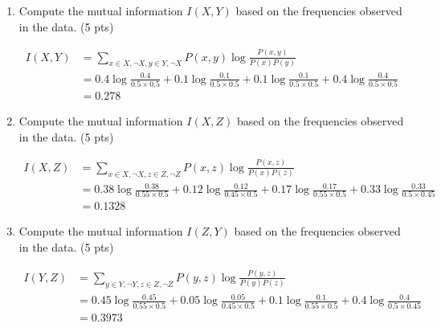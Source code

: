 \documentclass[a4paper]{article}
\theoremstyle{definition}
\newenvironment{soln}{
	\leavevmode\color{blue}\ignorespaces
}{}
\begin{document}
\begin{enumerate}
	\item Compute the mutual information $I(X, Y)$ based on the frequencies observed in the data. (5 pts)
	\begin{soln}
		\begin{align*}
			I(X, Y) &= \sum_{x \in X, \neg X, y \in Y,\neg X} P(x, y) \log \frac{P(x, y)}{P(x) P(y)} \\
			&= 0.4 \log \frac{0.4}{0.5 \times 0.5} + 0.1 \log \frac{0.1}{0.5 \times 0.5} + 0.1 \log \frac{0.1}{0.5 \times 0.5} + 0.4 \log \frac{0.4}{0.5 \times 0.5} \\
			&= 0.278
		\end{align*}
	\end{soln}
	\item Compute the mutual information $I(X, Z)$ based on the frequencies observed in the data. (5 pts)
	\begin{soln}
		\begin{align*}
			I(X, Z) &= \sum_{x \in X, \neg X, z \in Z,\neg Z} P(x, z) \log \frac{P(x, z)}{P(x) P(z)} \\
			&= 0.38 \log \frac{0.38}{0.55 \times 0.5} + 0.12 \log \frac{0.12}{0.45 \times 0.5} + 0.17 \log \frac{0.17}{0.55 \times 0.5} + 0.33 \log \frac{0.33}{0.5 \times 0.45} \\
			&= 0.1328
		\end{align*}
	\end{soln}
	\item Compute the mutual information $I(Z, Y)$ based on the frequencies observed in the data. (5 pts)
	\begin{soln}
		\begin{align*}
			I(Y, Z) &= \sum_{y \in Y, \neg Y, z \in Z,\neg Z} P(y, z) \log \frac{P(y, z)}{P(y) P(z)} \\
			&= 0.45 \log \frac{0.45}{0.55 \times 0.5} + 0.05 \log \frac{0.05}{0.45 \times 0.5} + 0.1 \log \frac{0.1}{0.55 \times 0.5} + 0.4 \log \frac{0.4}{0.5 \times 0.45} \\
			&= 0.3973
		\end{align*}
	\end{soln}


\end{enumerate}
\end{document}
